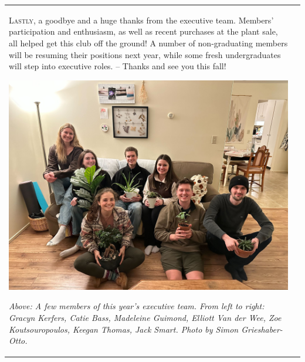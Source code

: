 \documentclass[fleqn]{article}
\begin{document}
\begin{tabular}{@{}
                         p{}%
		         @{\hspace{.04\columnwidth}}%
		         p{}%
		         @{}%
}
\lettrine[lines=3] {}{Lastly}, a goodbye and a huge thanks from the executive team. Members' participation and enthusiasm, as well as recent purchases at the plant sale, all helped get this club off the ground! A number of non-graduating members will be resuming their positions next year, while some fresh undergraduates will step into executive roles. -- Thanks and see you this fall!
\par\bigskip
\includegraphics[width=.59\columnwidth]{images/team.jpg}
\par\bigskip
\emph{Above: A few members of this year's executive team. From left to right: Gracyn Kerfers, Catie Bass, Madeleine Guimond, Elliott Van der Wee, Zoe Koutsouropoulos, Keegan Thomas, Jack Smart. Photo by Simon Grieshaber-Otto.}





\vfill
\end{tabular}
\clearpage
\end{document}
